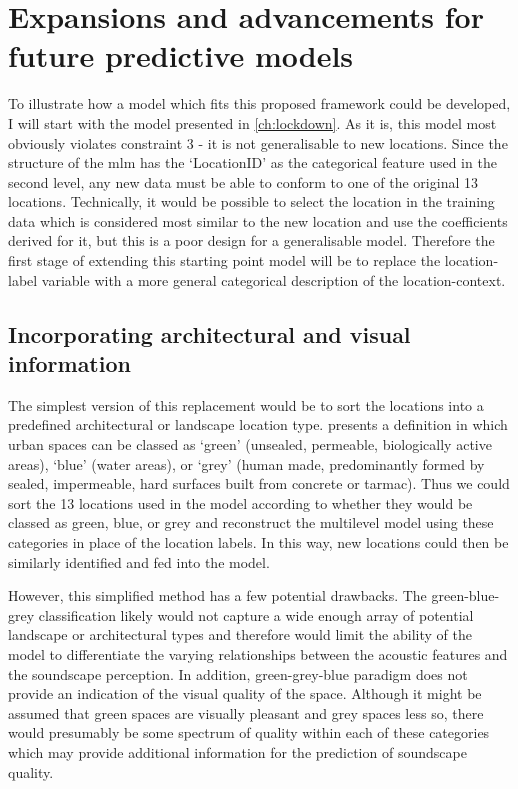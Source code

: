 \section{Expansions and advancements for future predictive models}

To illustrate how a model which fits this proposed framework could be developed, I will start with the model presented in \cref{ch:lockdown}. As it is, this model most obviously violates constraint 3 - it is not generalisable to new locations. Since the structure of the \gls{mlm} has the `LocationID' as the categorical feature used in the second level, any new data must be able to conform to one of the original 13 locations. Technically, it would be possible to select the location in the training data which is considered most similar to the new location and use the coefficients derived for it, but this is a poor design for a generalisable model. Therefore the first stage of extending this starting point model will be to replace the location-label variable with a more general categorical description of the location-context.

\subsection{Incorporating architectural and visual information}

The simplest version of this replacement would be to sort the locations into a predefined architectural or landscape location type. \citet{Suligowski2021Quantity} presents a definition in which urban spaces can be classed as `green' (unsealed, permeable, biologically active areas), `blue' (water areas), or `grey' (human made, predominantly formed by sealed, impermeable, hard surfaces built from concrete or tarmac). Thus we could sort the 13 locations used in the model according to whether they would be classed as green, blue, or grey and reconstruct the multilevel model using these categories in place of the location labels. In this way, new locations could then be similarly identified and fed into the model.

However, this simplified method has a few potential drawbacks. The green-blue-grey classification likely would not capture a wide enough array of potential landscape or architectural types and therefore would limit the ability of the model to differentiate the varying relationships between the acoustic features and the soundscape perception. In addition, green-grey-blue paradigm does not provide an indication of the visual quality of the space. Although it might be assumed that green spaces are visually pleasant and grey spaces less so, there would presumably be some spectrum of quality within each of these categories which may provide additional information for the prediction of soundscape quality.

